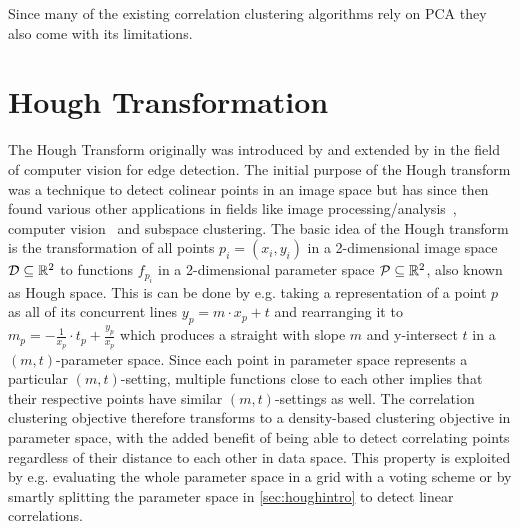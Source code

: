 Since many of the existing correlation clustering algorithms rely on \gls{PCA} they also come with its limitations.

\section{Hough Transformation}\label{sec:houghintro}
The Hough Transform originally was introduced by \textcite{houghOriginal1962method} and extended by \textcite{rosenfeld1969picture} in the field of computer vision for edge detection\cite{houghhistoryhart2009hough}. The initial purpose of the Hough transform was a technique to detect colinear points in an image space but has since then found various other applications in fields like image processing/analysis~\cite{rosenfeld1969picture,ballard1981generalizing}, computer vision~\cite{davies2004machine} and subspace clustering\cite{CASHachtert2008robust}.
The basic idea of the Hough transform is the transformation of all points $p_i = (x_i,y_i)$ in a 2-dimensional image space $\mathcal{D} \subseteq \mathbb{R}^2$ to functions $f_{p_i}$ in a 2-dimensional parameter space $\mathcal{P} \subseteq \mathbb{R}^2$, also known as Hough space\cite{illingworth1988survey}. This is can be done by e.g. taking a representation of a point $p$ as all of its concurrent lines $y_p = m \cdot x_p + t$ and rearranging it to $m_{p} = - \frac{1}{x_p} \cdot t_{p} + \frac{y_p}{x_p}$ which produces a straight with slope $m$ and y-intersect $t$ in a $(m,t)$-parameter space. Since each point in parameter space represents a particular $(m,t)$-setting, multiple functions close to each other implies that their respective points have similar $(m,t)$-settings as well. The correlation clustering objective therefore transforms to a density-based clustering objective in parameter space, with the added benefit of being able to detect correlating points regardless of their distance to each other in data space. This property is exploited by e.g. evaluating the whole parameter space in a grid with a voting scheme or by smartly splitting the parameter space in \autoref{sec:houghintro} to detect linear correlations. 

